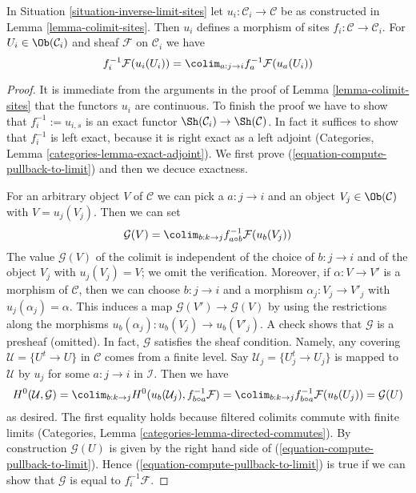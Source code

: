 \begin{lemma}
\label{lemma-compute-pullback-to-limit}
In Situation \ref{situation-inverse-limit-sites} let
$u_i : \mathcal{C}_i \to \mathcal{C}$ be as constructed in
Lemma \ref{lemma-colimit-sites}. Then $u_i$ defines a morphism
of sites $f_i : \mathcal{C} \to \mathcal{C}_i$. For
$U_i \in \Ob(\mathcal{C}_i)$ and sheaf $\mathcal{F}$ on $\mathcal{C}_i$ we have
\begin{equation}
\label{equation-compute-pullback-to-limit}
f_i^{-1}\mathcal{F}(u_i(U_i)) =
\colim_{a : j \to i} f_a^{-1}\mathcal{F}(u_a(U_i))
\end{equation}
\end{lemma}

\begin{proof}
It is immediate from the arguments in the proof of
Lemma \ref{lemma-colimit-sites} that the functors $u_i$ are continuous.
To finish the proof we have to show that $f_i^{-1} := u_{i, s}$
is an exact functor $\Sh(\mathcal{C}_i) \to \Sh(\mathcal{C})$.
In fact it suffices to show that $f_i^{-1}$ is left exact, because
it is right exact as a left adjoint
(Categories, Lemma \ref{categories-lemma-exact-adjoint}).
We first prove (\ref{equation-compute-pullback-to-limit})
and then we decuce exactness.

\medskip\noindent
For an arbitrary object $V$ of $\mathcal{C}$ we can pick a $a : j \to i$
and an object $V_j \in \Ob(\mathcal{C})$ with $V = u_j(V_j)$. Then we
can set
$$
\mathcal{G}(V) = \colim_{b : k \to j} f_{a \circ b}^{-1}\mathcal{F}(u_b(V_j))
$$
The value $\mathcal{G}(V)$ of the colimit is independent of the choice
of $b : j \to i$ and of the object $V_j$ with $u_j(V_j) = V$; we omit
the verification. Moreover, if $\alpha : V \to V'$ is a morphism of
$\mathcal{C}$, then we can choose $b : j \to i$ and a morphism
$\alpha_j : V_j \to V'_j$ with $u_j(\alpha_j) = \alpha$. This induces
a map $\mathcal{G}(V') \to \mathcal{G}(V)$ by using the restrictions
along the morphisms $u_b(\alpha_j) : u_b(V_j) \to u_b(V'_j)$. A check
shows that $\mathcal{G}$ is a presheaf (omitted).
In fact, $\mathcal{G}$ satisfies the sheaf condition. Namely,
any covering $\mathcal{U} = \{U^t \to U\}$ in $\mathcal{C}$
comes from a finite level. Say $\mathcal{U}_j = \{U^t_j \to U_j\}$
is mapped to $\mathcal{U}$ by $u_j$ for some $a : j \to i$ in $\mathcal{I}$.
Then we have
$$
H^0(\mathcal{U}, \mathcal{G}) =
\colim_{b : k \to j} H^0(u_b(\mathcal{U}_j), f_{b \circ a}^{-1}\mathcal{F}) =
\colim_{b : k \to j} f_{b \circ a}^{-1}\mathcal{F}(u_b(U_j)) =
\mathcal{G}(U)
$$
as desired. The first equality holds because filtered colimits commute
with finite limits
(Categories, Lemma \ref{categories-lemma-directed-commutes}).
By construction $\mathcal{G}(U)$ is given by the right hand side of
(\ref{equation-compute-pullback-to-limit}).
Hence (\ref{equation-compute-pullback-to-limit}) is true if we can
show that $\mathcal{G}$ is equal to $f_i^{-1}\mathcal{F}$.


\end{proof}
